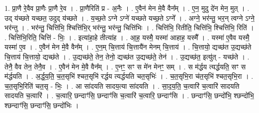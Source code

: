 \documentclass[17pt]{extarticle}
\begin{document}
1. प्रा॒णै रे॒वैव प्रा॒णैः प्रा॒णै रे॒व । . प्रा॒णैरिति॑ प्र - अ॒नैः । . ए॒वैन॑ मेन मे॒वै वैन᳚म् । . ए॒न॒ मुदु दे॑न मेन॒ मुत् । . उद् य॑च्छते यच्छत॒ उदुद् य॑च्छते । . य॒च्छ॒ते ऽग्ने ऽग्ने॑ यच्छते यच्छ॒ते ऽग्ने᳚ । . अग्ने॒ भर॑न्तु॒ भर॒न् त्वग्ने ऽग्ने॒ भर॑न्तु । . भर॑न्तु॒ चित्ति॑भि॒ श्चित्ति॑भि॒र् भर॑न्तु॒ भर॑न्तु॒ चित्ति॑भिः । . चित्ति॑भि॒ रितीति॒ चित्ति॑भि॒ श्चित्ति॑भि॒ रिति॑ । . चित्ति॑भि॒रिति॒ चित्ति॑ - भिः॒ । . इत्या॑हा॒हे तीत्या॑ह । . आ॒ह॒ यस्मै॒ यस्मा॑ आहाह॒ यस्मै᳚ । . यस्मा॑ ए॒वैव यस्मै॒ यस्मा॑ ए॒व । . ए॒वैन॑ मेन मे॒वै वैन᳚म् । . ए॒न॒म् चि॒त्ताय॑ चि॒त्तायै॑न मेनम् चि॒त्ताय॑ । . चि॒त्तायो॒ द्यच्छ॑त उ॒द्यच्छ॑ते चि॒त्ताय॑ चि॒त्तायो॒ द्यच्छ॑ते । . उ॒द्यच्छ॑ते॒ तेन॒ तेनो॒ द्यच्छ॑त उ॒द्यच्छ॑ते॒ तेन॑ । . उ॒द्यच्छ॑त॒ इत्यु॑त् - यच्छ॑ते । . तेनै॒ वैव तेन॒ तेनै॒व । . ए॒वैन॑ मेन मे॒वै वैन᳚म् । . ए॒नꣳ॒॒ सꣳ स मे॑न मेनꣳ॒॒ सम् । . स म॑र्द्धय त्यर्द्धयति॒ सꣳ स म॑र्द्धयति । . अ॒र्द्ध॒य॒ति॒ च॒त॒सृभि॑ श्चत॒सृभि॑ रर्द्धय त्यर्द्धयति चत॒सृभिः॑ । . च॒त॒सृभि॒रा च॑त॒सृभि॑ श्चत॒सृभि॒रा । . च॒त॒सृभि॒रिति॑ चत॒सृ - भिः॒ । . आ सा॑दयति सादय॒त्या सा॑दयति । . सा॒द॒य॒ति॒ च॒त्वारि॑ च॒त्वारि॑ सादयति सादयति च॒त्वारि॑ । . च॒त्वारि॒ छन्दाꣳ॑सि॒ छन्दाꣳ॑सि च॒त्वारि॑ च॒त्वारि॒ छन्दाꣳ॑सि । . छन्दाꣳ॑सि॒ छन्दो॑भि॒ श्छन्दो॑भि॒ श्छन्दाꣳ॑सि॒ छन्दाꣳ॑सि॒ छन्दो॑भिः । \newline
\end{document}
